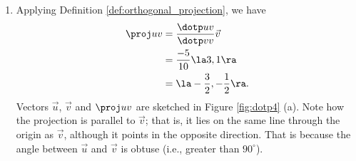 {\begin{enumerate}
	\item Applying Definition \ref{def:orthogonal_projection}, we have
	\begin{align*}
	\proj uv &= \frac{\dotp uv}{\dotp vv}\vec v \\
					&= \frac{-5}{10}\la 3,1\ra\\
					&= \la -\frac32,-\frac12\ra.
	\end{align*}
	Vectors $\vec u$, $\vec v$ and $\proj uv$ are sketched in Figure \ref{fig:dotp4} (a). Note how the projection is parallel to $\vec v$; that is, it lies on the same line through the origin as $\vec v$, although it points in the opposite direction. That is because the angle between $\vec u$ and $\vec v$ is obtuse (i.e., greater than $90^\circ$).
\end{enumerate}}
